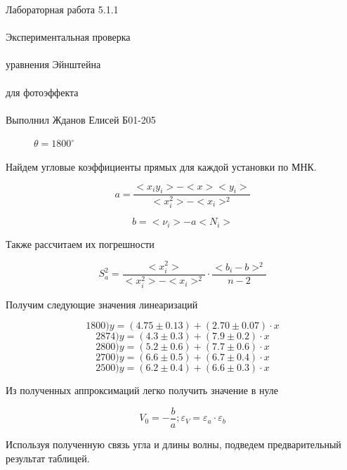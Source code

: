 \documentclass{astroedu-lab}
\begin{document}
\begin{problem}{\huge Лабораторная работа 5.1.1\\\\Экспериментальная проверка\\\\ уравнения Эйнштейна\\\\
для фотоэффекта\\\\Выполнил Жданов Елисей Б01-205}
\begin{figure}[h!]
\begin{minipage}[b]{0.48\textwidth}
        \caption{$\theta = 1800^\circ$}
        \label{fig:11}
    \end{minipage}
\end{figure}







Найдем угловые коэффициенты прямых для каждой установки по МНК.

\[
	a = \frac{<x_i y_i> - < x > < y_i >}{< x_i^2> - < x_i >^2}
\]

\[
	b = < \nu_i > - a < N_i >
\]

Также рассчитаем их погрешности

\begin{equation}
	S_a^2 = \frac{< x_i^2>}{< x_i^2 > - < x_i >^2} \cdot \frac{<  b_i - b > ^2}{n - 2}
\end{equation}

Получим следующие значения линеаризаций

\[1800) y = (4.75 \pm 0.13) + (2.70 \pm 0.07)\cdot x \]
\[2874) y = (4.3 \pm 0.3) + (7.9 \pm 0.2)\cdot x \]
\[2800) y = (5.2 \pm 0.6) + (7.7 \pm 0.6)\cdot x\] 
\[2700) y = (6.6 \pm 0.5) + (6.7 \pm 0.4)\cdot x\]
\[2500) y = (6.2 \pm 0.4) + (6.6 \pm 0.3)\cdot x \]


Из полученных аппроксимаций легко получить значение в нуле

\begin{equation}
	V_0 = -\frac{b}{a}; \varepsilon_V = \varepsilon_a \cdot \varepsilon_b
\end{equation}

Используя полученную связь угла и длины волны, подведем предварительный результат таблицей.


\end{problem}
\end{document}
